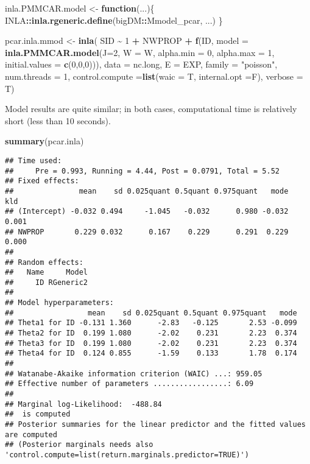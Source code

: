 \documentclass[
]{article}
\newenvironment{Shaded}{\begin{snugshade}}{\end{snugshade}}
\newcommand{\AttributeTok}[1]{\textcolor[rgb]{0.13,0.29,0.53}{#1}}
\newcommand{\ControlFlowTok}[1]{\textcolor[rgb]{0.13,0.29,0.53}{\textbf{#1}}}
\newcommand{\DecValTok}[1]{\textcolor[rgb]{0.00,0.00,0.81}{#1}}
\newcommand{\FunctionTok}[1]{\textcolor[rgb]{0.13,0.29,0.53}{\textbf{#1}}}
\newcommand{\NormalTok}[1]{#1}
\newcommand{\OtherTok}[1]{\textcolor[rgb]{0.56,0.35,0.01}{#1}}
\newcommand{\SpecialCharTok}[1]{\textcolor[rgb]{0.81,0.36,0.00}{\textbf{#1}}}
\newcommand{\StringTok}[1]{\textcolor[rgb]{0.31,0.60,0.02}{#1}}
\begin{document}
\begin{Shaded}
\begin{Highlighting}[]
\NormalTok{inla.PMMCAR.model }\OtherTok{\textless{}{-}} \ControlFlowTok{function}\NormalTok{(...)\{}
\NormalTok{  INLA}\SpecialCharTok{::}\FunctionTok{inla.rgeneric.define}\NormalTok{(bigDM}\SpecialCharTok{::}\NormalTok{Mmodel\_pcar, ...)}
\NormalTok{\}}

\NormalTok{pcar.inla.mmod }\OtherTok{\textless{}{-}} \FunctionTok{inla}\NormalTok{(}
\NormalTok{  SID }\SpecialCharTok{\textasciitilde{}} \DecValTok{1} \SpecialCharTok{+}\NormalTok{ NWPROP }\SpecialCharTok{+} 
    \FunctionTok{f}\NormalTok{(ID, }\AttributeTok{model =} \FunctionTok{inla.PMMCAR.model}\NormalTok{(}\AttributeTok{J=}\DecValTok{2}\NormalTok{, }\AttributeTok{W =}\NormalTok{ W, }\AttributeTok{alpha.min =} \DecValTok{0}\NormalTok{, }\AttributeTok{alpha.max =} \DecValTok{1}\NormalTok{,}
                                    \AttributeTok{initial.values =} \FunctionTok{c}\NormalTok{(}\DecValTok{0}\NormalTok{,}\DecValTok{0}\NormalTok{,}\DecValTok{0}\NormalTok{))),}
  \AttributeTok{data =}\NormalTok{ nc.long, }\AttributeTok{E =}\NormalTok{ EXP, }
  \AttributeTok{family =} \StringTok{"poisson"}\NormalTok{, }\AttributeTok{num.threads =} \DecValTok{1}\NormalTok{,}
  \AttributeTok{control.compute =}\FunctionTok{list}\NormalTok{(}\AttributeTok{waic =}\NormalTok{ T, }\AttributeTok{internal.opt =}\NormalTok{F),}
  \AttributeTok{verbose =}\NormalTok{ T)}
\end{Highlighting}
\end{Shaded}

Model results are quite similar; in both cases, computational time is
relatively short (less than 10 seconds).

\begin{Shaded}
\begin{Highlighting}[]
\FunctionTok{summary}\NormalTok{(pcar.inla)}
\end{Highlighting}
\end{Shaded}

\begin{verbatim}
## Time used:
##     Pre = 0.993, Running = 4.44, Post = 0.0791, Total = 5.52 
## Fixed effects:
##               mean    sd 0.025quant 0.5quant 0.975quant   mode   kld
## (Intercept) -0.032 0.494     -1.045   -0.032      0.980 -0.032 0.001
## NWPROP       0.229 0.032      0.167    0.229      0.291  0.229 0.000
## 
## Random effects:
##   Name     Model
##     ID RGeneric2
## 
## Model hyperparameters:
##                 mean    sd 0.025quant 0.5quant 0.975quant   mode
## Theta1 for ID -0.131 1.360      -2.83   -0.125       2.53 -0.099
## Theta2 for ID  0.199 1.080      -2.02    0.231       2.23  0.374
## Theta3 for ID  0.199 1.080      -2.02    0.231       2.23  0.374
## Theta4 for ID  0.124 0.855      -1.59    0.133       1.78  0.174
## 
## Watanabe-Akaike information criterion (WAIC) ...: 959.05
## Effective number of parameters .................: 6.09
## 
## Marginal log-Likelihood:  -488.84 
##  is computed 
## Posterior summaries for the linear predictor and the fitted values are computed
## (Posterior marginals needs also 'control.compute=list(return.marginals.predictor=TRUE)')
\end{verbatim}
\end{document}
